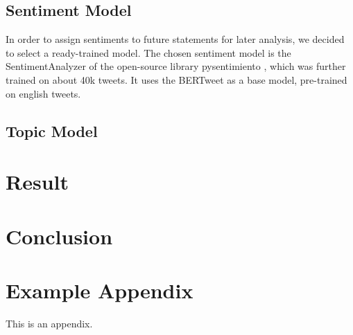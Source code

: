 \documentclass[11pt]{article}
\begin{document}
\subsection{Sentiment Model}
In order to assign sentiments to future statements for later analysis, we decided to select a ready-trained model.
The chosen sentiment model is the SentimentAnalyzer of the open-source library pysentimiento \citep{perez2021pysentimiento}, which was further trained on about 40k tweets. 
It uses the BERTweet \citep{bertweet} as a base model, pre-trained on english tweets.

\subsection{Topic Model}
\label{topic-model}

\section{Result}

\section{Conclusion}



\appendix

\section{Example Appendix}
\label{sec:appendix}

This is an appendix.
\end{document}
